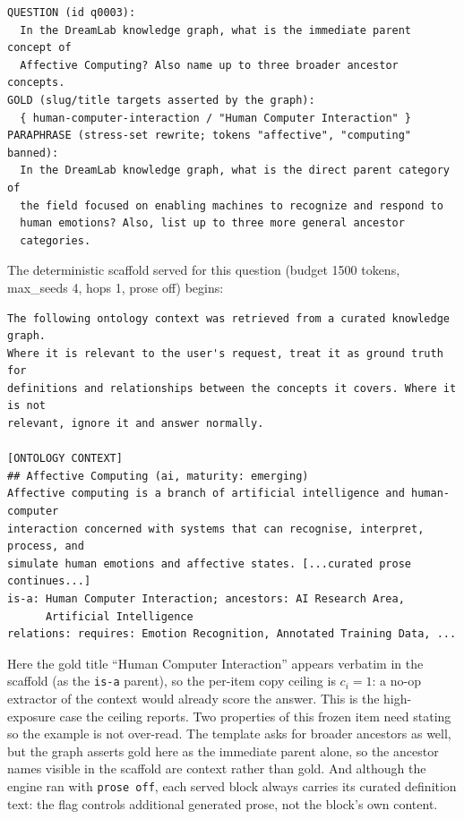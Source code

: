 \documentclass[10pt,twocolumn]{article}
\begin{document}
{\footnotesize\begin{verbatim}
QUESTION (id q0003):
  In the DreamLab knowledge graph, what is the immediate parent concept of
  Affective Computing? Also name up to three broader ancestor concepts.
GOLD (slug/title targets asserted by the graph):
  { human-computer-interaction / "Human Computer Interaction" }
PARAPHRASE (stress-set rewrite; tokens "affective", "computing" banned):
  In the DreamLab knowledge graph, what is the direct parent category of
  the field focused on enabling machines to recognize and respond to
  human emotions? Also, list up to three more general ancestor
  categories.
\end{verbatim}}

\noindent The deterministic scaffold served for this question (budget 1500 tokens, max\_seeds 4,
hops 1, prose off) begins:

{\footnotesize\begin{verbatim}
The following ontology context was retrieved from a curated knowledge graph.
Where it is relevant to the user's request, treat it as ground truth for
definitions and relationships between the concepts it covers. Where it is not
relevant, ignore it and answer normally.

[ONTOLOGY CONTEXT]
## Affective Computing (ai, maturity: emerging)
Affective computing is a branch of artificial intelligence and human-computer
interaction concerned with systems that can recognise, interpret, process, and
simulate human emotions and affective states. [...curated prose continues...]
is-a: Human Computer Interaction; ancestors: AI Research Area,
      Artificial Intelligence
relations: requires: Emotion Recognition, Annotated Training Data, ...
\end{verbatim}}

\noindent Here the gold title ``Human Computer Interaction'' appears verbatim in the scaffold
(as the \texttt{is-a} parent), so the per-item copy ceiling is $c_i=1$: a no-op extractor of the
context would already score the answer. This is the high-exposure case the ceiling reports.
Two properties of this frozen item need stating so the example is not over-read. The template asks for
broader ancestors as well, but the graph asserts gold here as the immediate parent alone, so the ancestor
names visible in the scaffold are context rather than gold. And although the engine ran with
\texttt{prose~off}, each served block always carries its curated definition text: the flag controls
additional generated prose, not the block's own content.

\twocolumn
\printbibliography
\end{document}
